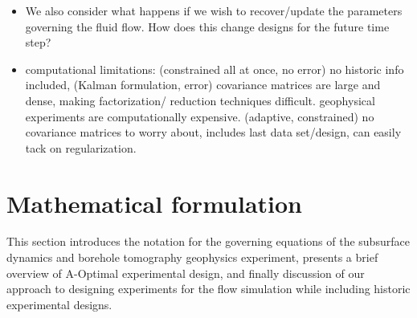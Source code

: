 \documentclass[12pt]{article}
\begin{document}
\begin{itemize}

\item We also consider what happens if we wish to recover/update the parameters governing the fluid flow. How does this change designs for the future time step? 


\item computational limitations: (constrained all at once, no error) no historic info included, (Kalman formulation, error) covariance matrices are large and dense, making factorization/ reduction techniques difficult. geophysical experiments are computationally expensive. (adaptive, constrained)
no covariance matrices to worry about, includes last data set/design, can easily tack on regularization.
\end{itemize}


\section{Mathematical formulation}
This section  introduces the notation for the governing equations of the subsurface dynamics and borehole tomography geophysics experiment, presents a brief overview of A-Optimal experimental design, and finally  discussion of our approach to designing experiments for the flow simulation while including historic experimental designs. 
\end{document}
